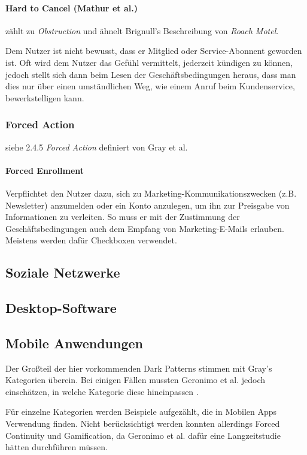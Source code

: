 \documentclass[a4paper]{article}
\begin{document}
\paragraph{Hard to Cancel (Mathur et al.)} zählt zu \textit{Obstruction} und ähnelt Brignull's Beschreibung von \textit{Roach Motel}. 

Dem Nutzer ist nicht bewusst, dass er Mitglied oder Service-Abonnent geworden ist. Oft wird dem Nutzer das Gefühl vermittelt, jederzeit kündigen zu können, jedoch stellt sich dann beim Lesen der Geschäftsbedingungen heraus, dass man dies nur über einen umständlichen Weg, wie einem Anruf beim Kundenservice, bewerkstelligen kann. 

\subsubsection{Forced Action}
siehe 2.4.5 \textit{Forced Action} definiert von Gray et al.

\paragraph{Forced Enrollment}
Verpflichtet den Nutzer dazu, sich zu Marketing-Kommunikationszwecken (z.B. Newsletter) anzumelden oder ein Konto anzulegen, um ihn zur Preisgabe von Informationen zu verleiten. So muss er mit der Zustimmung der Geschäftsbedingungen auch dem Empfang von Marketing-E-Mails erlauben. Meistens werden dafür Checkboxen verwendet.

\subsection{Soziale Netzwerke}
\label{sub:soziale_netzwerke}

\subsection{Desktop-Software}
\label{sub:desktop-software}

\subsection{Mobile Anwendungen}
\label{sub:mobile_anwendungen}
Der Großteil der hier vorkommenden Dark Patterns stimmen mit Gray's Kategorien überein. Bei einigen Fällen mussten Geronimo et al. jedoch einschätzen, in welche Kategorie diese hineinpassen \cite{geronimo}.

Für einzelne Kategorien werden Beispiele aufgezählt, die in Mobilen Apps Verwendung finden. Nicht berücksichtigt werden konnten allerdings Forced Continuity und Gamification, da Geronimo et al. dafür eine Langzeitstudie hätten durchführen müssen.\newline
\end{document}
